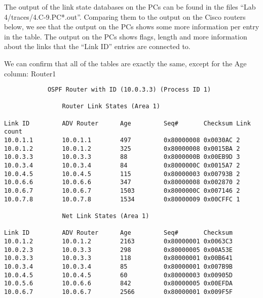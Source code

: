 The output of the link state databases on the PCs can be found in the files ``Lab 4/traces/4.C-9.PC*.out''. Comparing them to the output on the Cisco routers below, we see that the output on the PCs shows some more information per entry in the table. The output on the PCs shows flags, length and more information about the links that the ``Link ID'' entries are connected to.

We can confirm that all of the tables are exactly the same, except for the Age column:
Router1
\begin{lstlisting}
            OSPF Router with ID (10.0.3.3) (Process ID 1)

                Router Link States (Area 1)

Link ID         ADV Router      Age         Seq#       Checksum Link count
10.0.1.1        10.0.1.1        497         0x80000008 0x0030AC 2
10.0.1.2        10.0.1.2        325         0x80000008 0x0015BA 2
10.0.3.3        10.0.3.3        88          0x8000000B 0x00EB9D 3
10.0.3.4        10.0.3.4        84          0x8000000C 0x0015A7 2
10.0.4.5        10.0.4.5        115         0x80000003 0x00793B 2
10.0.6.6        10.0.6.6        347         0x80000008 0x002870 2
10.0.6.7        10.0.6.7        1503        0x8000000C 0x007146 2
10.0.7.8        10.0.7.8        1534        0x80000009 0x00CFFC 1

                Net Link States (Area 1)

Link ID         ADV Router      Age         Seq#       Checksum
10.0.1.2        10.0.1.2        2163        0x80000001 0x0063C3
10.0.2.3        10.0.3.3        298         0x80000005 0x00A53E
10.0.3.3        10.0.3.3        118         0x80000001 0x00B641
10.0.3.4        10.0.3.4        85          0x80000001 0x007B9B
10.0.4.5        10.0.4.5        60          0x80000003 0x00905D
10.0.5.6        10.0.6.6        842         0x80000005 0x00EFDA
10.0.6.7        10.0.6.7        2566        0x80000001 0x009F5F
\end{lstlisting}

